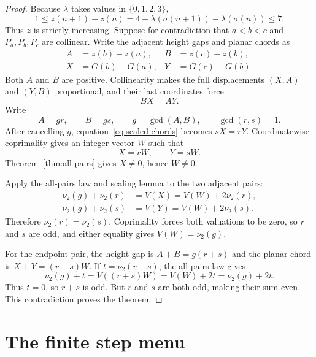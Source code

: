 \documentclass[11pt]{article}
\theoremstyle{definition}
\theoremstyle{remark}
\newcommand{\vTwo}{\nu_2}
\begin{document}
\begin{proof}
Because $\lambda$ takes values in $\{0,1,2,3\}$,
\begin{equation}\label{eq:height-step}
 1\le z(n+1)-z(n)
   =4+\lambda(\sigma(n+1))-\lambda(\sigma(n))\le7.
\end{equation}
Thus $z$ is strictly increasing.  Suppose for contradiction that
$a<b<c$ and $P_a,P_b,P_c$ are collinear.  Write the adjacent height gaps
and planar chords as
\[
\begin{aligned}
 A&=z(b)-z(a),& B&=z(c)-z(b),\\
 X&=G(b)-G(a),& Y&=G(c)-G(b).
\end{aligned}
\]
Both $A$ and $B$ are positive.  Collinearity makes the full displacements
$(X,A)$ and $(Y,B)$ proportional, and their last coordinates force
\begin{equation}\label{eq:scaled-chords}
 BX=AY.
\end{equation}
Write
\[
 A=gr,\qquad B=gs,\qquad
 g=\gcd(A,B),\qquad \gcd(r,s)=1.
\]
After cancelling $g$, equation~\eqref{eq:scaled-chords} becomes $sX=rY$.
Coordinatewise coprimality gives an integer vector $W$ such that
\begin{equation}\label{eq:common-vector}
 X=rW,\qquad Y=sW.
\end{equation}
Theorem~\ref{thm:all-pairs} gives $X\ne0$, hence $W\ne0$.

Apply the all-pairs law and scaling lemma to the two adjacent pairs:
\begin{align*}
 \vTwo(g)+\vTwo(r)
  &=V(X)=V(W)+2\vTwo(r),\\
 \vTwo(g)+\vTwo(s)
  &=V(Y)=V(W)+2\vTwo(s).
\end{align*}
Therefore $\vTwo(r)=\vTwo(s)$.  Coprimality forces both valuations to be
zero, so $r$ and $s$ are odd, and either equality gives
$V(W)=\vTwo(g)$.

For the endpoint pair, the height gap is $A+B=g(r+s)$ and the planar chord
is $X+Y=(r+s)W$.  If $t=\vTwo(r+s)$, the all-pairs law gives
\[
 \vTwo(g)+t
 =V((r+s)W)
 =V(W)+2t
 =\vTwo(g)+2t.
\]
Thus $t=0$, so $r+s$ is odd.  But $r$ and $s$ are both odd, making their
sum even.  This contradiction proves the theorem.
\end{proof}

\section{The finite step menu}\label{sec:steps}
\end{document}
